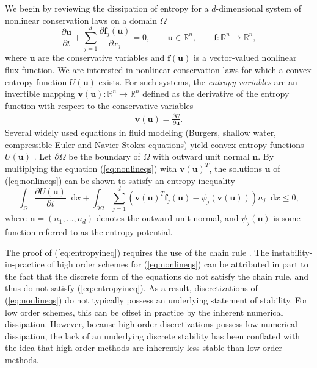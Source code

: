 \documentclass[review]{siamart0216}
\theoremstyle{assumption}
\newcommand{\pd}[2]{\frac{\partial#1}{\partial#2}}
\newcommand{\LRp}[1]{\left( #1 \right)}
\newcommand*\diff[1]{\mathop{}\!{\mathrm{d}#1}}
\begin{document}
We begin by reviewing the dissipation of entropy for a $d$-dimensional system of nonlinear conservation laws on a domain $\Omega$
\begin{equation}
\pd{\bm{u}}{t}  + \sum_{j=1}^d\pd{\bm{f}_j(\bm{u})}{x_j} = 0, \qquad \bm{u}\in \mathbb{R}^n, \qquad \bm{f}:\mathbb{R}^n\rightarrow\mathbb{R}^n,
\label{eq:nonlineqs}
\end{equation}
where $\bm{u}$ are the conservative variables and $\bm{f}(\bm{u})$ is a vector-valued nonlinear flux function.  We are interested in nonlinear conservation laws for which a convex entropy function $U(\bm{u})$ exists.  For such systems, the  \emph{entropy variables} are an invertible mapping $\bm{v}(\bm{u}):\mathbb{R}^n\rightarrow \mathbb{R}^n$ defined as the derivative of the entropy function with respect to the conservative variables 
\begin{align}
\bm{v}(\bm{u}) = \pd{U}{\bm{u}}.%
\label{eq:entropyvarsmap}
\end{align}
Several widely used equations in fluid modeling (Burgers, shallow water, compressible Euler and Navier-Stokes equations) yield convex entropy functions $U(\bm{u})$ \cite{hughes1986new, chen2017entropy}.  Let $\partial \Omega$ be the boundary of $\Omega$ with outward unit normal $\bm{n}$.  By multiplying the equation (\ref{eq:nonlineqs}) with $\bm{v}(\bm{u})^T$, the solutions $\bm{u}$ of (\ref{eq:nonlineqs}) can be shown to satisfy an entropy inequality
\begin{equation}
\int_{\Omega}\pd{U(\bm{u})}{t}\diff{x} + \int_{\partial \Omega} \sum_{j=1}^d \LRp{\bm{v}(\bm{u})^T\bm{f}_j(\bm{u}) - \psi_j\LRp{\bm{v}(\bm{u})}}n_j \diff{x} \leq 0, 
\label{eq:entropyineq}
\end{equation}
where $\bm{n} = \LRp{n_1,\ldots,n_d}$ denotes the outward unit normal, and $\psi_j(\bm{u})$ is some function referred to as the entropy potential.  

The proof of (\ref{eq:entropyineq}) requires the use of the chain rule \cite{mock1980systems, harten1983symmetric, dafermos2005compensated}.  The instability-in-practice of high order schemes for (\ref{eq:nonlineqs}) can be attributed in part to the fact that the discrete form of the equations do not satisfy the chain rule, and thus do not satisfy (\ref{eq:entropyineq}).  As a result, discretizations of (\ref{eq:nonlineqs}) do not typically possess an underlying statement of stability.  For low order schemes, this can be offset in practice by the inherent numerical dissipation.  However, because high order discretizations possess low numerical dissipation, the lack of an underlying discrete stability has been conflated with the idea that high order methods are inherently less stable than low order methods.
\end{document}
